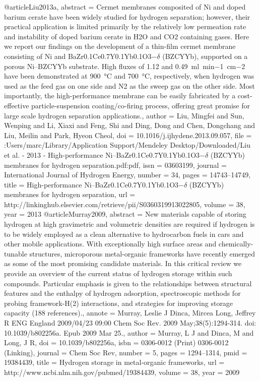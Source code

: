 @article{Liu2013a,
abstract = {Cermet membranes composited of Ni and doped barium cerate have been widely studied for hydrogen separation; however, their practical application is limited primarily by the relatively low permeation rate and instability of doped barium cerate in H2O and CO2 containing gases. Here we report our findings on the development of a thin-film cermet membrane consisting of Ni and BaZr0.1Ce0.7Y0.1Yb0.1O3−$\delta$ (BZCYYb), supported on a porous Ni–BZCYYb substrate. High fluxes of 1.12 and 0.49 ml min−1 cm−2 have been demonstrated at 900 °C and 700 °C, respectively, when hydrogen was used as the feed gas on one side and N2 as the sweep gas on the other side. Most importantly, the high-performance membrane can be easily fabricated by a cost-effective particle-suspension coating/co-firing process, offering great promise for large scale hydrogen separation applications.},
author = {Liu, Mingfei and Sun, Wenping and Li, Xiaxi and Feng, Shi and Ding, Dong and Chen, Dongchang and Liu, Meilin and Park, Hyeon Cheol},
doi = {10.1016/j.ijhydene.2013.09.057},
file = {:Users/marc/Library/Application Support/Mendeley Desktop/Downloaded/Liu et al. - 2013 - High-performance Ni–BaZr0.1Ce0.7Y0.1Yb0.1O3−$\delta$ (BZCYYb) membranes for hydrogen separation.pdf:pdf},
issn = {03603199},
journal = {International Journal of Hydrogen Energy},
number = {34},
pages = {14743--14749},
title = {{High-performance Ni–BaZr0.1Ce0.7Y0.1Yb0.1O3−$\delta$ (BZCYYb) membranes for hydrogen separation}},
url = {http://linkinghub.elsevier.com/retrieve/pii/S0360319913022805},
volume = {38},
year = {2013}
}
@article{Murray2009,
abstract = {New materials capable of storing hydrogen at high gravimetric and volumetric densities are required if hydrogen is to be widely employed as a clean alternative to hydrocarbon fuels in cars and other mobile applications. With exceptionally high surface areas and chemically-tunable structures, microporous metal-organic frameworks have recently emerged as some of the most promising candidate materials. In this critical review we provide an overview of the current status of hydrogen storage within such compounds. Particular emphasis is given to the relationships between structural features and the enthalpy of hydrogen adsorption, spectroscopic methods for probing framework-H(2) interactions, and strategies for improving storage capacity (188 references).},
annote = {Murray, Leslie J
Dinca, Mircea
Long, Jeffrey R
ENG
England
2009/04/23 09:00
Chem Soc Rev. 2009 May;38(5):1294-314. doi: 10.1039/b802256a. Epub 2009 Mar 25.},
author = {Murray, L J and Dinca, M and Long, J R},
doi = {10.1039/b802256a},
isbn = {0306-0012 (Print)
0306-0012 (Linking)},
journal = {Chem Soc Rev},
number = {5},
pages = {1294--1314},
pmid = {19384439},
title = {{Hydrogen storage in metal-organic frameworks}},
url = {http://www.ncbi.nlm.nih.gov/pubmed/19384439},
volume = {38},
year = {2009}
}

